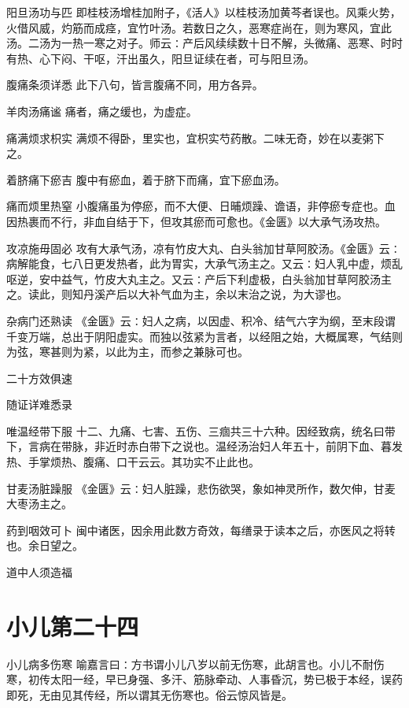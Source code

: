 \documentclass[a4paper,12pt,UTF8,twoside]{ctexbook}
\begin{document}
    阳旦汤功与匹
    即桂枝汤增桂加附子，《活人》以桂枝汤加黄芩者误也。风乘火势，火借风威，灼筋而成痉，宜竹叶汤。若数日之久，恶寒症尚在，则为寒风，宜此汤。二汤为一热一寒之对子。师云∶产后风续续数十日不解，头微痛、恶寒、时时有热、心下闷、干呕，汗出虽久，阳旦证续在者，可与阳旦汤。
    
    腹痛条须详悉
    此下八句，皆言腹痛不同，用方各异。
    
    羊肉汤痛谧
    痛者，痛之缓也，为虚症。
    
    痛满烦求枳实
    满烦不得卧，里实也，宜枳实芍药散。二味无奇，妙在以麦粥下之。
    
    着脐痛下瘀吉
    腹中有瘀血，着于脐下而痛，宜下瘀血汤。
    
    痛而烦里热窒
    小腹痛虽为停瘀，而不大便、日晡烦躁、谵语，非停瘀专症也。血因热裹而不行，非血自结于下，但攻其瘀而可愈也。《金匮》以大承气汤攻热。
    
    攻凉施毋固必
    攻有大承气汤，凉有竹皮大丸、白头翁加甘草阿胶汤。《金匮》云∶病解能食，七八日更发热者，此为胃实，大承气汤主之。又云∶妇人乳中虚，烦乱呕逆，安中益气，竹皮大丸主之。又云∶产后下利虚极，白头翁加甘草阿胶汤主之。读此，则知丹溪产后以大补气血为主，余以末治之说，为大谬也。
    
    杂病门还熟读
    《金匮》云∶妇人之病，以因虚、积冷、结气六字为纲，至末段谓千变万端，总出于阴阳虚实。而独以弦紧为言者，以经阻之始，大概属寒，气结则为弦，寒甚则为紧，以此为主，而参之兼脉可也。
    
    二十方效俱速
    
    随证详难悉录
    
    唯温经带下服
    十二、九痛、七害、五伤、三痼共三十六种。因经致病，统名曰带下，言病在带脉，非近时赤白带下之说也。温经汤治妇人年五十，前阴下血、暮发热、手掌烦热、腹痛、口干云云。其功实不止此也。
    
    甘麦汤脏躁服
    《金匮》云∶妇人脏躁，悲伤欲哭，象如神灵所作，数欠伸，甘麦大枣汤主之。
    
    药到咽效可卜
    闽中诸医，因余用此数方奇效，每缮录于读本之后，亦医风之将转也。余日望之。
    
    道中人须造福
    \chapter{小儿第二十四}
      小儿病多伤寒
    喻嘉言曰∶方书谓小儿八岁以前无伤寒，此胡言也。小儿不耐伤寒，初传太阳一经，早已身强、多汗、筋脉牵动、人事昏沉，势已极于本经，误药即死，无由见其传经，所以谓其无伤寒也。俗云惊风皆是。
    
\end{document}
